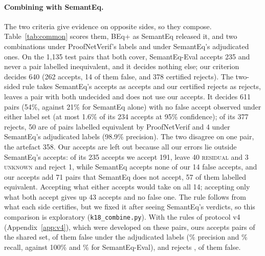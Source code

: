 \documentclass[10pt]{article}
\theoremstyle{definition}
\newcommand{\V}[1]{\textsc{#1}}
\begin{document}
\paragraph{Combining with SemantEq.} The two criteria give evidence on opposite sides, so they
compose. Table~\ref{tab:common} scores them, BEq+ as SemantEq released it, and two combinations
under ProofNetVerif's labels and under SemantEq's adjudicated ones. On the 1,135 test pairs that both cover, SemantEq-Eval accepts 235 and never a pair
labelled inequivalent, and it decides nothing else; our criterion decides 640 (262 accepts, 14 of
them false, and 378 certified rejects). The two-sided rule takes SemantEq's accepts as accepts and
our certified rejects as rejects, leaves a pair with both undecided and does not use our accepts. It
decides 611 pairs (54\%, against 21\% for SemantEq alone) with no false accept observed under either
label set (at most 1.6\% of its 234 accepts at 95\% confidence); of its 377
rejects, 50 are of pairs labelled equivalent by ProofNetVerif and 4 under SemantEq's adjudicated
labels (98.9\% precision). The two disagree on one pair, the artefact 358. Our accepts are left
out because all our errors lie outside SemantEq's accepts: of its 235 accepts we accept 191, leave 40
\V{residual} and 3 \V{unknown} and reject 1, while SemantEq accepts none of
our 14 false accepts, and our accepts add 71 pairs that SemantEq does not accept, 57 of them
labelled equivalent. Accepting what either accepts would take on all 14; accepting only what both
accept gives up 43 accepts and no false one. The rule follows from what each side certifies, but we
fixed it after seeing SemantEq's verdicts, so this comparison is exploratory (\texttt{k18\_combine.py}).
With the rules of protocol v4 (Appendix~\ref{app:v4}), which were developed on these pairs, ours
accepts \VfSharedVfourAcc{} pairs of the shared set, \VfSharedVfourFA{} of them false under the
adjudicated labels (\VfSharedVfourPrec\% precision and \VfSharedVfourRecall\% recall, against 100\%
and \VfSharedSemRecall\% for SemantEq-Eval), and rejects \VfSharedVfourRej{}, \VfSharedVfourFalseRej{}
of them false.
\end{document}
